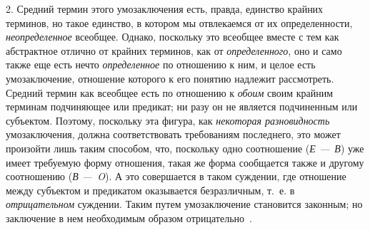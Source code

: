 \documentclass[twoside]{article}
\begin{document}
{{{{{2. Средний термин этого умозаключения есть, правда, единство
крайних терминов, но такое единство, в котором мы отвлекаемся от их
определенности, {\em неопределенное}
всеобщее. Однако, поскольку это всеобщее вместе с тем как
абстрактное отлично от крайних терминов, как от
{\em определенного}, оно
и само также еще есть нечто
{\em определенное} по
отношению к ним, и целое есть умозаключение, отношение которого к его
понятию надлежит рассмотреть. Средний термин как всеобщее есть по отношению
к {\em обоим} своим
крайним терминам подчиняющее или предикат; ни разу он не является
подчиненным или субъектом. Поэтому, поскольку эта фигура, как
{\em некоторая разновидность}
умозаключения, должна соответствовать требованиям последнего,
это может произойти лишь таким способом, что, поскольку одно соотношение
({\em Е —~В})
уже имеет требуемую форму отношения, такая же форма
сообщается также и другому соотношению
({\em В —~O}). А это
совершается в таком суждении, где отношение между субъектом и предикатом
оказывается безразличным, т.~е. в
{\em отрицательном}
суждении. Таким путем умозаключение становится законным; но
заключение в нем необходимым образом
отрицательно~\label{bkm:bm54}.

}}}}}
\end{document}

